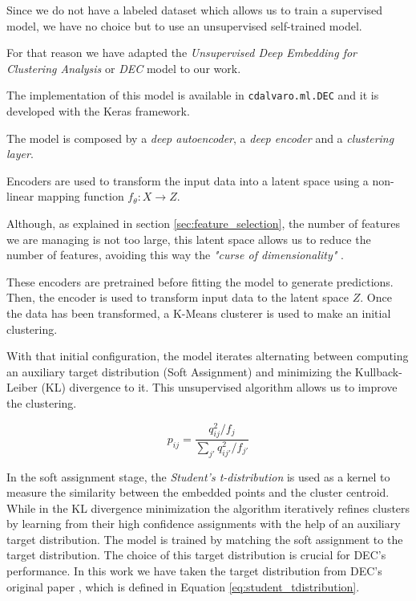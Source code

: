 \documentclass[11pt, a4paper, english]{book}
\begin{document}
Since we do not have a labeled dataset which allows us to train a supervised model, we have no choice but to use an unsupervised self-trained model.

For that reason we have adapted the \emph{Unsupervised Deep Embedding for Clustering Analysis} or \emph{DEC} model \cite{xie2016unsupervised} to our work.

The implementation of this model is available in \verb|cdalvaro.ml.DEC| and it is developed with the Keras framework.

The model is composed by a \emph{deep autoencoder}, a \emph{deep encoder} and a \emph{clustering layer}.

Encoders are used to transform the input data into a latent space using a non-linear mapping function $f_{\theta} : X \rightarrow Z$.

Although, as explained in section \ref{sec:feature_selection}, the number of features we are managing is not too large, this latent space allows us to reduce
the number of features, avoiding this way the \emph{"curse of dimensionality"} \cite{bellman1961curse}.

These encoders are pretrained before fitting the model to generate predictions. Then, the encoder is used to transform input data to the
latent space $Z$. Once the data has been transformed, a K-Means clusterer is used to make an initial clustering.

With that initial configuration, the model iterates alternating between computing an auxiliary target distribution (Soft Assignment)
and minimizing the Kullback-Leiber (KL) divergence \cite{kullback1951information} to it. This unsupervised algorithm allows us to improve
the clustering.

\begin{equation}
  p_{ij} = \frac{q^{2}_{ij} / f_{j}}{\sum_{j'}q^{2}_{ij'}/f_{j'}}
  \label{eq:student_tdistribution}
\end{equation}

In the soft assignment stage, the \emph{Student's t-distribution} is used as a kernel to measure the similarity
between the embedded points and the cluster centroid. While in the KL divergence minimization the algorithm iteratively refines clusters by learning
from their high confidence assignments with the help of an auxiliary target distribution. The model is trained by matching the soft assignment to the
target distribution. The choice of this target distribution is crucial for DEC's performance. In this work we have taken the target distribution
from DEC's original paper \cite{xie2016unsupervised}, which is defined in Equation \ref{eq:student_tdistribution}.
\end{document}
